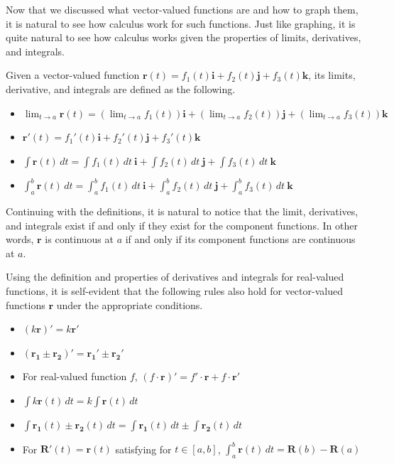 \documentclass[../../../main.tex]{subfiles}
\begin{document}
Now that we discussed what vector-valued functions are and how to
graph them, it is natural to see how calculus work for such functions.
Just like graphing, it is quite natural to see how calculus works
given the properties of limits, derivatives, and integrals.

\begin{important}
Given a vector-valued function $\mathbf{r}(t) = f_1(t) \mathbf{i}
+ f_2(t) \mathbf{j} + f_3(t) \mathbf{k}$, its limits, derivative,
and integrals are defined as the following.
\begin{itemize}
\item $\displaystyle \lim_{t \to a} \mathbf{r}(t) = 
    \left( \lim_{t \to a} f_1(t) \right) \mathbf{i} +
    \left( \lim_{t \to a} f_2(t) \right) \mathbf{j} +
    \left( \lim_{t \to a} f_3(t) \right) \mathbf{k}$
\item $\mathbf{r}'(t) = f_1'(t) \mathbf{i} + f_2'(t) \mathbf{j} +
    f_3'(t) \mathbf{k}$
\item $\displaystyle \int\mathbf{r}(t)\, dt =
    \int f_1(t)\, dt\ \mathbf{i} +
    \int f_2(t)\, dt\ \mathbf{j} +
    \int f_3(t)\, dt\ \mathbf{k}$
\item $\displaystyle \int_{a}^{b} \mathbf{r}(t)\, dt =
    \int_{a}^{b} f_1(t)\, dt\ \mathbf{i} +
    \int_{a}^{b} f_2(t)\, dt\ \mathbf{j} +
    \int_{a}^{b} f_3(t)\, dt\ \mathbf{k}$
\end{itemize}
\end{important}

Continuing with the definitions, it is natural to notice that the
limit, derivatives, and integrals exist if and only if they
exist for the component functions. In other words, $\mathbf{r}$
is continuous at $a$ if and only if its component functions are
continuous at $a$.

\begin{important}
Using the definition and properties of derivatives and integrals for
real-valued functions, it is self-evident that the following rules
also hold for vector-valued functions $\mathbf{r}$ under the
appropriate conditions.
\begin{itemize}
\item $(k\mathbf{r})' = k\mathbf{r}'$
\item $(\mathbf{r_1} \pm \mathbf{r_2})'=
    \mathbf{r_1}' \pm \mathbf{r_2}'$
\item For real-valued function $f$, $(f \cdot \mathbf{r})' =
    f' \cdot \mathbf{r} + f \cdot \mathbf{r}'$
\item $\displaystyle \int k\mathbf{r}(t)\, dt =
    k \int \mathbf{r}(t)\, dt$
\item $\displaystyle \int \mathbf{r_1}(t) \pm \mathbf{r_2}(t)\, dt =
    \int \mathbf{r_1}(t)\, dt \pm \int \mathbf{r_2}(t)\, dt$
\item For $\mathbf{R}'(t) = \mathbf{r}(t)$ satisfying for
$t \in [a, b]$, $\displaystyle \int_{a}^{b} \mathbf{r}(t)\, dt =
    \mathbf{R}(b) - \mathbf{R}(a)$
\end{itemize}
\end{important}
\end{document}
